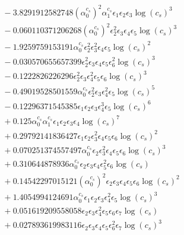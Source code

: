 \documentclass[10pt]{article}
\begin{document}
\begin{align*}
&{}  - 3.8291912582748 \left(\alpha_{0}^{c_s}\right)^{2} \alpha_{1}^{c_s} \epsilon_{1} \epsilon_{2} \epsilon_{3} \log{\left(c_{s} \right)}^{3} \\
&{}  - 0.060110371206268 \left(\alpha_{0}^{c_s}\right)^{2} \epsilon_{2}^{2} \epsilon_{3} \epsilon_{4} \epsilon_{5} \log{\left(c_{s} \right)}^{3} \\
&{}  - 1.9259759153191 \alpha_{0}^{c_s} \epsilon_{2}^{2} \epsilon_{3}^{2} \epsilon_{4} \epsilon_{5} \log{\left(c_{s} \right)}^{2} \\
&{}  - 0.030570655657399 \epsilon_{2}^{2} \epsilon_{3} \epsilon_{4} \epsilon_{5} \epsilon_{6}^{2} \log{\left(c_{s} \right)}^{3} \\
&{}  - 0.1222826226296 \epsilon_{2}^{2} \epsilon_{3} \epsilon_{4}^{2} \epsilon_{5} \epsilon_{6} \log{\left(c_{s} \right)}^{3} \\
&{}  - 0.49019528501559 \alpha_{0}^{c_s} \epsilon_{2}^{2} \epsilon_{3} \epsilon_{4}^{2} \epsilon_{5} \log{\left(c_{s} \right)}^{5} \\
&{}  - 0.12296371545385 \epsilon_{1} \epsilon_{2} \epsilon_{3} \epsilon_{4}^{3} \epsilon_{5} \log{\left(c_{s} \right)}^{6} \\
&{}  + 0.125 \alpha_{0}^{c_s} \alpha_{1}^{c_s} \epsilon_{1} \epsilon_{2} \epsilon_{3} \epsilon_{4} \log{\left(c_{s} \right)}^{7} \\
&{}  + 0.29792141836427 \epsilon_{1} \epsilon_{2} \epsilon_{3}^{2} \epsilon_{4} \epsilon_{5} \epsilon_{6} \log{\left(c_{s} \right)}^{2} \\
&{}  + 0.070251374557497 \alpha_{0}^{c_s} \epsilon_{2} \epsilon_{3}^{2} \epsilon_{4} \epsilon_{5} \epsilon_{6} \log{\left(c_{s} \right)}^{3} \\
&{}  + 0.310644878936 \alpha_{0}^{c_s} \epsilon_{2} \epsilon_{3} \epsilon_{4} \epsilon_{5}^{2} \epsilon_{6} \log{\left(c_{s} \right)} \\
&{}  + 0.14542297015121 \left(\alpha_{0}^{c_s}\right)^{2} \epsilon_{2} \epsilon_{3} \epsilon_{4} \epsilon_{5} \epsilon_{6} \log{\left(c_{s} \right)}^{2} \\
&{}  + 1.4054994124691 \alpha_{0}^{c_s} \epsilon_{1} \epsilon_{2} \epsilon_{3} \epsilon_{4}^{2} \epsilon_{5} \log{\left(c_{s} \right)}^{3} \\
&{}  + 0.051619209558058 \epsilon_{2} \epsilon_{3} \epsilon_{4}^{2} \epsilon_{5} \epsilon_{6} \epsilon_{7} \log{\left(c_{s} \right)} \\
&{}  + 0.027893619983116 \epsilon_{2} \epsilon_{3} \epsilon_{4} \epsilon_{5} \epsilon_{6}^{2} \epsilon_{7} \log{\left(c_{s} \right)}^{3} \\

\end{align*}
\end{document}
